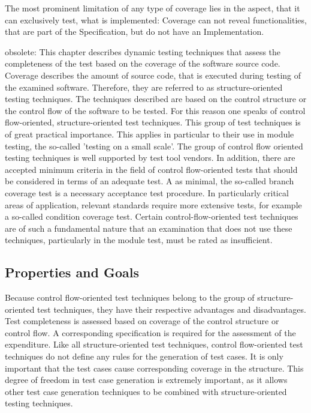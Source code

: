 	
	
	The most prominent limitation of any type of coverage lies in the aspect, that it can exclusively test, what is implemented: Coverage can not reveal functionalities, that are part of the Specification, but do not have an Implementation.
	
	obsolete:
	This chapter describes dynamic testing techniques that assess the completeness of the test based on the coverage of the software source code. Coverage describes the amount of source code, that is executed during testing of the examined software. Therefore, they are referred to as structure-oriented testing techniques. The techniques described are based on the control structure or the control flow of the software to be tested. For this reason one speaks of control flow-oriented, structure-oriented test techniques. This group of test techniques is of great practical importance. This applies in particular to their use in module testing, the so-called 'testing on a small scale'. The group of control flow oriented testing techniques is well supported by test tool vendors. In addition, there are accepted minimum criteria in the field of control flow-oriented tests that should be considered in terms of an adequate test. A as minimal, the so-called branch coverage test is a necessary acceptance test procedure. In particularly critical areas of application, relevant standards require more extensive tests, for example a so-called condition coverage test. Certain control-flow-oriented test techniques are of such a fundamental nature that an examination that does not use these techniques, particularly in the module test, must be rated as insufficient.	
	

	\subsection{Properties and Goals }

	Because control flow-oriented test techniques belong to the group of structure-oriented test techniques, they have their respective advantages and disadvantages. Test completeness is assessed based on coverage of the control structure or control flow. A corresponding specification is required for the assessment of the expenditure. Like all structure-oriented test techniques, control flow-oriented test techniques do not define any rules for the generation of test cases. It is only important that the test cases cause corresponding coverage in the structure. This degree of freedom in test case generation is extremely important, as it allows other test case generation techniques to be combined with structure-oriented testing techniques.

